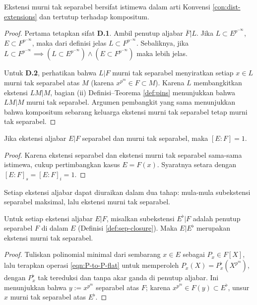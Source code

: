 \begin{proposition}\label{prop:pins-dist}
	Ekstensi murni tak separabel bersifat istimewa dalam arti Konvensi \ref{con:dist-extensions} dan tertutup terhadap kompositum.
\end{proposition}
\begin{proof}
	Pertama tetapkan sifat \textbf{D.1}. Ambil penutup aljabar $\overline{F}|L$. Jika $L \subset E^{p^{-\infty}}$, $E \subset F^{p^{-\infty}}$, maka dari definisi jelas $L \subset F^{p^{-\infty}}$. Sebaliknya, jika $L \subset F^{p^{-\infty}} \implies (L \subset E^{p^{-\infty}}) \wedge (E \subset F^{p^{-\infty}})$ maka lebih jelas.

	Untuk \textbf{D.2}, perhatikan bahwa $L|F$ murni tak separabel menyiratkan setiap $x \in L$ murni tak separabel atas $M$ (karena $x^{p^m} \in F \subset M$). Karena $L$ membangkitkan ekstensi $LM|M$, bagian (ii) Definisi--Teorema \ref{def:pins} menunjukkan bahwa $LM|M$ murni tak separabel. Argumen pembangkit yang sama menunjukkan bahwa kompositum sebarang keluarga ekstensi murni tak separabel tetap murni tak separabel.
\end{proof}

\begin{lemma}\label{prop:pins-sep}
	Jika ekstensi aljabar $E|F$ separabel dan murni tak separabel, maka $[E:F]=1$.
\end{lemma}
\begin{proof}
	Karena ekstensi separabel dan ekstensi murni tak separabel sama-sama istimewa, cukup pertimbangkan kasus $E=F(x)$. Syaratnya setara dengan $[E:F]_s = [E:F]_i = 1$.
\end{proof}

Setiap ekstensi aljabar dapat diuraikan dalam dua tahap: mula-mula subekstensi separabel maksimal, lalu ekstensi murni tak separabel.
\begin{proposition}\label{prop:pins-devissage}
	Untuk setiap ekstensi aljabar $E|F$, misalkan subekstensi $E^\flat|F$ adalah penutup separabel $F$ di dalam $E$ (Definisi \ref{def:sep-closure}). Maka $E|E^\flat$ merupakan ekstensi murni tak separabel.
\end{proposition}
\begin{proof}
	Tuliskan polinomial minimal dari sembarang $x \in E$ sebagai $P_x \in F[X]$, lalu terapkan operasi \eqref{eqn:P-to-P-flat} untuk memperoleh $P_x(X) = P_x^\flat\left( X^{p^m} \right)$, dengan $P_x^\flat$ tak tereduksi dan tanpa akar ganda di penutup aljabar. Ini menunjukkan bahwa $y := x^{p^m}$ separabel atas $F$; karena $x^{p^m} \in F(y) \subset E^\flat$, unsur $x$ murni tak separabel atas $E^\flat$.
\end{proof}

